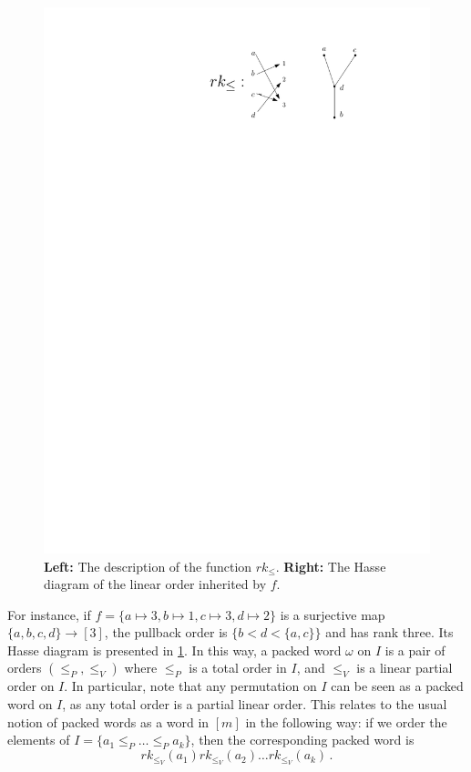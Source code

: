 \documentclass[12pt, reqno]{amsart}
\theoremstyle{definition}
\begin{document}
\begin{figure}[h]
	\centering
	\includegraphics[scale=1]{../images/packedWordOrder.pdf}
	\caption{\textbf{Left:} The description of the function $rk_{\leq}$. \textbf{Right:} The Hasse diagram of the linear order inherited by $f$. \label{fig:packedWordOrder}}
\end{figure}

For instance, if $f = \{ a\mapsto 3, b\mapsto 1, c\mapsto 3, d\mapsto 2\}$ is a surjective map $\{a, b, c, d\}\to[3]$, the pullback order is $\{b < d < \{a, c \}\}$ and has rank three.
Its Hasse diagram is presented in \cref{fig:packedWordOrder}.
In this way, a packed word $\omega$ on $I$ is a pair of orders $(\leq_P, \leq_V)$ where $\leq_P$ is a total order in $I$, and $\leq_V$ is a linear partial order on $I$.
In particular, note that any permutation on $I$ can be seen as a packed word on $I$, as any total order is a partial linear order.
This relates to the usual notion of packed words as a word in $[m]$ in the following way:
if we order the elements of $I = \{a_1 \leq_P \dots \leq_P a_k \}$, then the corresponding packed word is 
$$rk_{\leq_V}(a_1)rk_{\leq_V}(a_2) \dots rk_{\leq_V}(a_k) \, .$$
\end{document}

